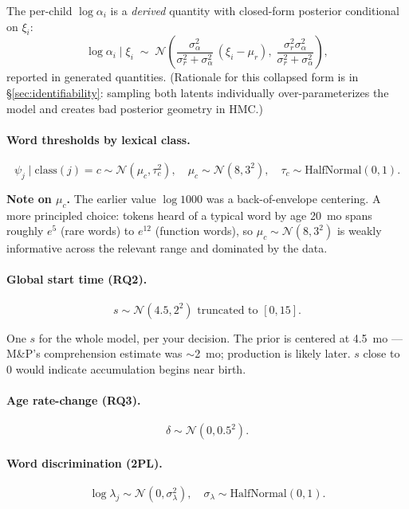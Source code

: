 \documentclass[11pt]{article}
\newcommand{\Norm}{\mathcal{N}}
\newcommand{\HN}{\mathrm{HalfNormal}}
\begin{document}
The per-child \(\log \alpha_i\) is a \emph{derived} quantity with closed-form
posterior conditional on \(\xi_i\):
\[
\log \alpha_i \mid \xi_i \;\sim\;
\Norm\!\left(\frac{\sigma_\alpha^2}{\sigma_r^2 + \sigma_\alpha^2}\,(\xi_i - \mu_r),
\;\frac{\sigma_r^2 \sigma_\alpha^2}{\sigma_r^2 + \sigma_\alpha^2}\right),
\]
reported in generated quantities. (Rationale for this collapsed form is
in \S\ref{sec:identifiability}: sampling both latents individually
over-parameterizes the model and creates bad posterior geometry in HMC.)

\paragraph{Word thresholds by lexical class.}
\begin{equation}
\psi_j \mid \mathrm{class}(j) = c \sim \Norm(\mu_c, \tau_c^2),
\quad \mu_c \sim \Norm(8, 3^2), \quad \tau_c \sim \HN(0, 1).
\end{equation}

\textbf{Note on \(\mu_c\).} The earlier value \(\log 1000\) was a
back-of-envelope centering. A more principled choice: tokens heard of a
typical word by age 20~mo spans roughly \(e^5\) (rare words) to \(e^{12}\)
(function words), so \(\mu_c \sim \Norm(8, 3^2)\) is weakly informative
across the relevant range and dominated by the data.

\paragraph{Global start time (RQ2).}
\begin{equation}
s \sim \Norm(4.5, 2^2) \text{ truncated to } [0, 15].
\end{equation}

One $s$ for the whole model, per your decision. The prior is centered at
4.5~mo — M\&P's comprehension estimate was \(\sim\)2~mo; production is
likely later. \(s\) close to 0 would indicate accumulation begins near
birth.

\paragraph{Age rate-change (RQ3).}
\begin{equation}
\delta \sim \Norm(0, 0.5^2).
\end{equation}

\paragraph{Word discrimination (2PL).}
\begin{equation}
\log \lambda_j \sim \Norm(0, \sigma_\lambda^2),
\quad \sigma_\lambda \sim \HN(0, 1).
\end{equation}
\end{document}
